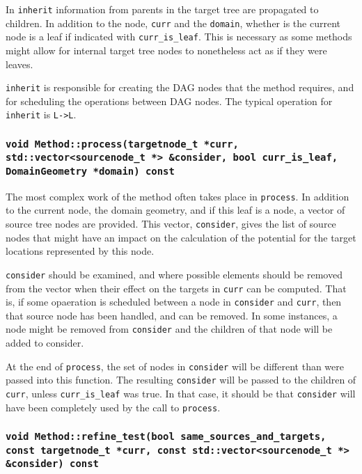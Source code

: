 In \texttt{inherit} information from parents in the target tree are propagated
to children. In addition to the node, \texttt{curr} and the \texttt{domain},
whether is the current node is a leaf if indicated with
\texttt{curr\_is\_leaf}. This is necessary as some methods might allow for
internal target tree nodes to nonetheless act as if they were leaves.

\texttt{inherit} is responsible for creating the DAG nodes that the method
requires, and for scheduling the operations between DAG nodes. The typical
operation for \texttt{inherit} is \texttt{L->L}.

\subsubsection{\texttt{void Method::process(targetnode\_t *curr, std::vector<sourcenode\_t *> \&consider, bool curr\_is\_leaf, DomainGeometry *domain) const}}

The most complex work of the method often takes place in \texttt{process}. In
addition to the current node, the domain geometry, and if this leaf is a node,
a vector of source tree nodes are provided. This vector, \texttt{consider},
gives the list of source nodes that might have an impact on the calculation of
the potential for the target locations represented by this node.

\texttt{consider} should be examined, and where possible elements should be
removed from the vector when their effect on the targets in \texttt{curr} can
be computed. That is, if some opaeration is scheduled between a node in
\texttt{consider} and \texttt{curr}, then that source node has been handled,
and can be removed. In some instances, a node might be removed from
\texttt{consider} and the children of that node will be added to consider.

At the end of \texttt{process}, the set of nodes in \texttt{consider} will be
different than were passed into this function. The resulting \texttt{consider}
will be passed to the children of \texttt{curr}, unless \texttt{curr\_is\_leaf}
was true. In that case, it should be that \texttt{consider} will have been
completely used by the call to \texttt{process}.

\subsubsection{\texttt{void Method::refine\_test(bool same\_sources\_and\_targets, const targetnode\_t *curr, const std::vector<sourcenode\_t *> \&consider) const}}

